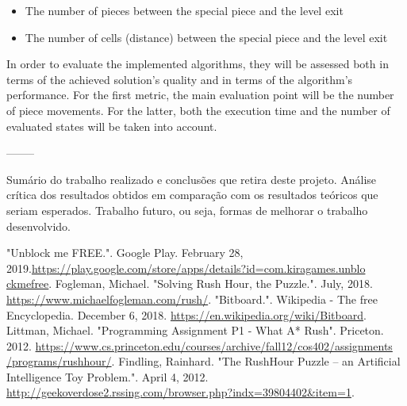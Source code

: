 \documentclass[conference]{IEEEtran}
\begin{document}
\begin{itemize}
    \item The number of pieces between the special piece and the level exit
    \item The number of cells (distance) between the special piece and the level exit
\end{itemize}

In order to evaluate the implemented algorithms, they will be assessed both in terms of the achieved solution's quality and in terms of the algorithm's performance. For the first metric, the main evaluation point will be the number of piece movements. For the latter, both the execution time and the number of evaluated states will be taken into account.

--------

Sumário do trabalho realizado e conclusões que retira deste projeto. Análise crítica dos resultados obtidos em comparação com os resultados teóricos que seriam esperados. Trabalho futuro, ou seja, formas de melhorar o trabalho desenvolvido.

\begin{thebibliography}{00}
    
 "Unblock me FREE.". Google Play. February 28, 2019.\href{https://play.google.com/store/apps/details?id=com.kiragames.unblockmefree}{https://play.google.com/store/apps/details?id=com.kiragames.unblo\\ckmefree}.
 Fogleman, Michael. "Solving Rush Hour, the Puzzle.". July, 2018. \href{https://www.michaelfogleman.com/rush/}{https://www.michaelfogleman.com/rush/}.
 "Bitboard.". Wikipedia - The free Encyclopedia. December 6, 2018. \href{https://en.wikipedia.org/wiki/Bitboard}{https://en.wikipedia.org/wiki/Bitboard}.
 Littman, Michael. "Programming Assignment P1 - What A* Rush". Priceton. 2012. \href{https://www.cs.princeton.edu/courses/archive/fall12/cos402/assignments/programs/rushhour/}{https://www.cs.princeton.edu/courses/archive/fall12/cos402/assignments\\/programs/rushhour/}.
 Findling, Rainhard. "The RushHour Puzzle – an Artificial Intelligence Toy Problem.". April 4, 2012. \href{http://geekoverdose2.rssing.com/browser.php?indx=39804402\&item=1}{http://geekoverdose2.rssing.com/browser.php?indx=39804402\&item=1}.
\end{thebibliography}
\end{document}
